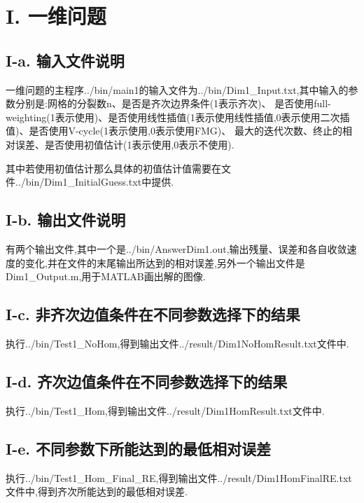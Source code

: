 \documentclass[twoside,a4paper]{article}
\begin{document}
\pagestyle{fancy}
\fancyhead{}
\section*{I. 一维问题}
\subsection*{I-a. 输入文件说明}
\hspace{0.9em}
一维问题的主程序../bin/main1的输入文件为../bin/Dim1\_Input.txt,其中输入的参数分别是:网格的分裂数n、是否是齐次边界条件(1表示齐次)、
是否使用full-weighting(1表示使用)、是否使用线性插值(1表示使用线性插值,0表示使用二次插值)、是否使用V-cycle(1表示使用,0表示使用FMG)、
最大的迭代次数、终止的相对误差、是否使用初值估计(1表示使用,0表示不使用).

其中若使用初值估计那么具体的初值估计值需要在文件../bin/Dim1\_InitialGuess.txt中提供.

\subsection*{I-b. 输出文件说明}
\hspace{0.9em}
有两个输出文件,其中一个是../bin/AnswerDim1.out,输出残量、误差和各自收敛速度的变化,并在文件的末尾输出所达到的相对误差,另外一个输出文件是Dim1\_Output.m,用于MATLAB画出解的图像.

\subsection*{I-c. 非齐次边值条件在不同参数选择下的结果}
\hspace{0.9em}
执行../bin/Test1\_NoHom,得到输出文件../result/Dim1NoHomResult.txt文件中.

\subsection*{I-d. 齐次边值条件在不同参数选择下的结果}
\hspace{0.9em}
执行../bin/Test1\_Hom,得到输出文件../result/Dim1HomResult.txt文件中.

\subsection*{I-e. 不同参数下所能达到的最低相对误差}
\hspace{0.9em}
执行../bin/Test1\_Hom\_Final\_RE,得到输出文件../result/Dim1HomFinalRE.txt文件中,得到齐次所能达到的最低相对误差.
\end{document}
